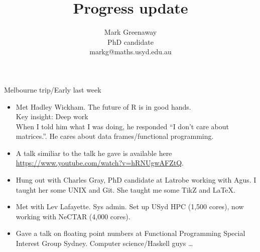 \documentclass{beamer}
\title{Progress update}
\author{Mark Greenaway\\PhD candidate\\markg@maths.usyd.edu.au}
\begin{document}
\begin{frame}
\titlepage
\end{frame}

\begin{frame}{Melbourne trip/Early last week}
\begin{itemize}
\item Met Hadley Wickham. The future of R is in good hands. \\
	Key insight: Deep work \\
	When I told him what I was doing, he responded ``I don't care about matrices.''. He cares 
	about data frames/functional programming. \\
\item A talk similiar to the talk he gave is available here \url{https://www.youtube.com/watch?v=hRNUgwAFZtQ}.
\item Hung out with Charles Gray, PhD candidate at Latrobe working with Agus. I taught her some UNIX and Git.
	She taught me some TikZ and LaTeX.
	
\item Met with Lev Lafayette. Sys admin. Set up USyd HPC (1,500 cores), now working with NeCTAR (4,000 cores). 
\item Gave a talk on floating point numbers at Functional Programming Special Interest Group Sydney.
			Computer science/Haskell guys \ldots
\end{itemize}
\end{frame}
\end{document}
